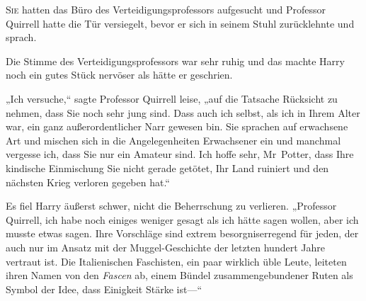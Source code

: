 
\lettrine{S}{ie} hatten das Büro des Verteidigungsprofessors aufgesucht und Professor Quirrell hatte die Tür versiegelt, bevor er sich in seinem Stuhl zurücklehnte und sprach.

Die Stimme des Verteidigungsprofessors war sehr ruhig und das machte Harry noch ein gutes Stück nervöser als hätte er geschrien.

„Ich versuche,“ sagte Professor Quirrell leise, „auf die Tatsache Rücksicht zu nehmen, dass Sie noch sehr jung sind. Dass auch ich selbst, als ich in Ihrem Alter war, ein ganz außerordentlicher Narr gewesen bin. Sie sprachen auf erwachsene Art und mischen sich in die Angelegenheiten Erwachsener ein und manchmal vergesse ich, dass Sie nur ein Amateur sind. Ich hoffe sehr, Mr~Potter, dass Ihre kindische Einmischung Sie nicht gerade getötet, Ihr Land ruiniert und den nächsten Krieg verloren gegeben hat.“

Es fiel Harry äußerst schwer, nicht die Beherrschung zu verlieren. „Professor Quirrell, ich habe noch einiges weniger gesagt als ich hätte sagen wollen, aber ich musste etwas sagen. Ihre Vorschläge sind extrem besorgniserregend für jeden, der auch nur im Ansatz mit der Muggel-Geschichte der letzten hundert Jahre vertraut ist. Die Italienischen Faschisten, ein paar wirklich üble Leute, leiteten ihren Namen von den \emph{Fascen} ab, einem Bündel zusammengebundener Ruten als Symbol der Idee, dass Einigkeit Stärke ist—“

